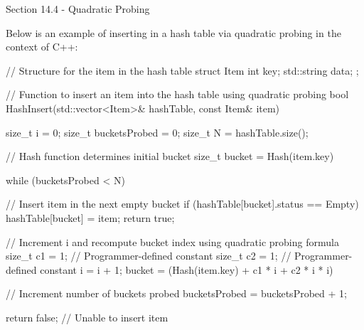 \begin{notes}{Section 14.4 - Quadratic Probing}
    \begin{highlight}
        Below is an example of inserting in a hash table via quadratic probing in the context of C++:
    
    \begin{code}[C++]
    // Structure for the item in the hash table
    struct Item {
        int key;
        std::string data;
    };
    
    // Function to insert an item into the hash table using quadratic probing
    bool HashInsert(std::vector<Item>& hashTable, const Item& item) {
        size_t i = 0;
        size_t bucketsProbed = 0;
        size_t N = hashTable.size();
    
        // Hash function determines initial bucket
        size_t bucket = Hash(item.key) %
    
        while (bucketsProbed < N) {
            // Insert item in the next empty bucket
            if (hashTable[bucket].status == Empty) {
                hashTable[bucket] = item;
                return true;
            }
    
            // Increment i and recompute bucket index using quadratic probing formula
            size_t c1 = 1; // Programmer-defined constant
            size_t c2 = 1; // Programmer-defined constant
            i = i + 1;
            bucket = (Hash(item.key) + c1 * i + c2 * i * i) %
    
            // Increment number of buckets probed
            bucketsProbed = bucketsProbed + 1;
        }
    
        return false; // Unable to insert item
    }
    \end{code}
    \end{highlight}
\end{notes}

